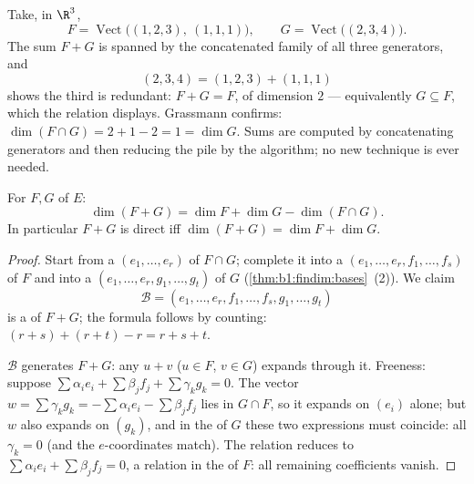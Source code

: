 \begin{example}
\label{ex:b1:findim:sumconcat}
Take, in $\R^3$,
\[
F = \operatorname{Vect}\bigl((1,2,3),\ (1,1,1)\bigr),
\qquad
G = \operatorname{Vect}\bigl((2,3,4)\bigr) .
\]
The sum $F + G$ is spanned by the concatenated family of all
three generators, and
\[
(2, 3, 4) = (1, 2, 3) + (1, 1, 1)
\]
shows the third is redundant: $F + G = F$, of dimension $2$ ---
equivalently $G \subseteq F$, which the relation displays.
Grassmann confirms: $\dim(F \cap G) = 2 + 1 - 2 = 1 = \dim G$.
Sums are computed by concatenating generators and then reducing
the pile by the  algorithm; no new technique is ever needed.
\end{example}

\begin{theorem}\label{thm:b1:findim:grassmann}
For   $F, G$ of
$E$:
\[
\dim(F + G) = \dim F + \dim G - \dim(F \cap G) .
\]
In particular $F + G$ is direct iff $\dim(F + G) = \dim F + \dim G$.
\end{theorem}

\begin{proof}
Start from a  $(e_1, \dots, e_r)$ of $F \cap G$; complete it
into a  $(e_1, \dots, e_r, f_1, \dots, f_s)$ of $F$ and into a
 $(e_1, \dots, e_r, g_1, \dots, g_t)$ of $G$
(\cref{thm:b1:findim:bases}~(2)). We claim
\[
\mathcal{B} = (e_1, \dots, e_r, f_1, \dots, f_s, g_1, \dots, g_t)
\]
is a  of $F + G$; the formula follows by counting: $(r + s) +
(r + t) - r = r + s + t$.

$\mathcal{B}$ generates $F + G$: any $u + v$ ($u \in F$, $v \in G$)
expands through it. Freeness: suppose $\sum \alpha_i e_i + \sum
\beta_j f_j + \sum \gamma_k g_k = 0$. The vector $w = \sum \gamma_k
g_k = -\sum\alpha_i e_i - \sum\beta_j f_j$ lies in $G \cap F$, so it
expands on $(e_i)$ alone; but $w$ also expands on $(g_k)$, and in
the  of $G$ these two expressions must coincide: all
$\gamma_k = 0$ (and the $e$-coordinates match). The relation reduces
to $\sum\alpha_i e_i + \sum\beta_j f_j = 0$, a relation in the 
of $F$: all remaining coefficients vanish.
\end{proof}

